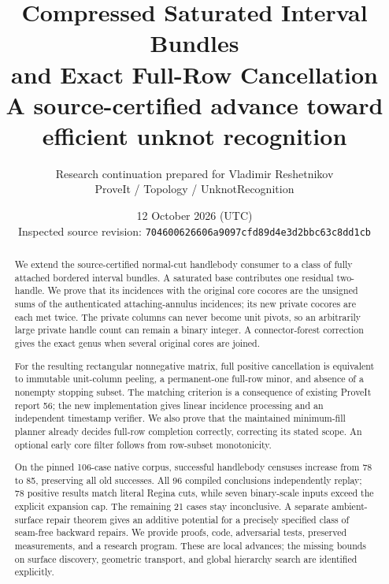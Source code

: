 \documentclass[11pt]{article}
\title{\color{ink}\bfseries Compressed Saturated Interval Bundles\\[4pt]
 and Exact Full-Row Cancellation\\[7pt]
 \large A source-certified advance toward efficient unknot recognition}
\author{Research continuation prepared for Vladimir Reshetnikov\\
 \small ProveIt / Topology / UnknotRecognition}
\date{12 October 2026 (UTC)\\
 \small Inspected source revision: \texttt{704600626606a9097cfd89d4e3d2bbc63c8dd1cb}}
\theoremstyle{definition}
\theoremstyle{remark}
\begin{document}
\maketitle
\begin{abstract}
We extend the source-certified normal-cut handlebody consumer to a class of
fully attached bordered interval bundles.  A saturated base contributes one
residual two-handle.  We prove that its incidences with the original core
cocores are the unsigned sums of the authenticated attaching-annulus
incidences; its new private cocores are each met twice.  The private columns
can never become unit pivots, so an arbitrarily large private handle count
can remain a binary integer.  A connector-forest correction gives the exact
genus when several original cores are joined.

For the resulting rectangular nonnegative matrix, full positive cancellation
is equivalent to immutable unit-column peeling, a permanent-one full-row
minor, and absence of a nonempty stopping subset.  The matching criterion is
a consequence of existing ProveIt report 56; the new implementation gives
linear incidence processing and an independent timestamp verifier.  We also
prove that the maintained minimum-fill planner already decides full-row
completion correctly, correcting its stated scope.  An optional early core
filter follows from row-subset monotonicity.

On the pinned 106-case native corpus, successful handlebody censuses increase
from 78 to 85, preserving all old successes.  All 96 compiled conclusions
independently replay; 78 positive results match literal Regina cuts, while
seven binary-scale inputs exceed the explicit expansion cap.  The remaining
21 cases stay inconclusive.  A separate ambient-surface repair theorem gives
an additive potential for a precisely specified class of seam-free backward
repairs.  We provide proofs, code, adversarial tests, preserved measurements,
and a research program.  These are local advances; the missing bounds on
surface discovery, geometric transport, and global hierarchy search are
identified explicitly.
\end{abstract}

\tableofcontents
\newpage









\appendix


\end{document}
